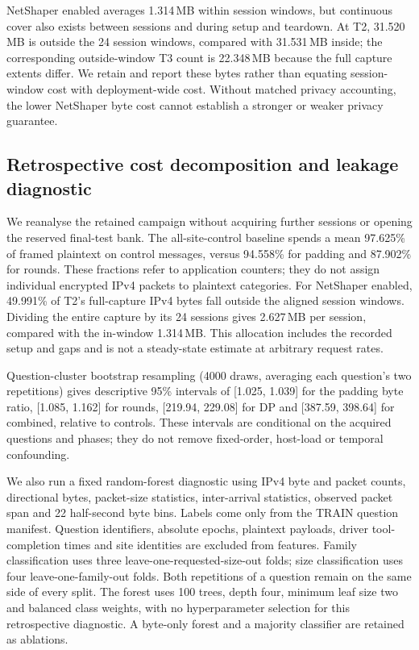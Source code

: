 NetShaper enabled averages 1.314\,MB within session windows, but continuous cover also exists between sessions and during setup and teardown. At T2, 31.520\,MB is outside the 24 session windows, compared with 31.531\,MB inside; the corresponding outside-window T3 count is 22.348\,MB because the full capture extents differ. We retain and report these bytes rather than equating session-window cost with deployment-wide cost. Without matched privacy accounting, the lower NetShaper byte cost cannot establish a stronger or weaker privacy guarantee.


\subsection{Retrospective cost decomposition and leakage diagnostic}\label{sec:retrospective}
We reanalyse the retained campaign without acquiring further sessions or opening the reserved final-test bank. The all-site-control baseline spends a mean 97.625\% of framed plaintext on control messages, versus 94.558\% for padding and 87.902\% for rounds. These fractions refer to application counters; they do not assign individual encrypted IPv4 packets to plaintext categories. For NetShaper enabled, 49.991\% of T2's full-capture IPv4 bytes fall outside the aligned session windows. Dividing the entire capture by its 24 sessions gives 2.627\,MB per session, compared with the in-window 1.314\,MB. This allocation includes the recorded setup and gaps and is not a steady-state estimate at arbitrary request rates.

Question-cluster bootstrap resampling (4000 draws, averaging each question's two repetitions) gives descriptive 95\% intervals of [1.025, 1.039] for the padding byte ratio, [1.085, 1.162] for rounds, [219.94, 229.08] for DP and [387.59, 398.64] for combined, relative to controls. These intervals are conditional on the acquired questions and phases; they do not remove fixed-order, host-load or temporal confounding.

We also run a fixed random-forest diagnostic using IPv4 byte and packet counts, directional bytes, packet-size statistics, inter-arrival statistics, observed packet span and 22 half-second byte bins. Labels come only from the TRAIN question manifest. Question identifiers, absolute epochs, plaintext payloads, driver tool-completion times and site identities are excluded from features. Family classification uses three leave-one-requested-size-out folds; size classification uses four leave-one-family-out folds. Both repetitions of a question remain on the same side of every split. The forest uses 100 trees, depth four, minimum leaf size two and balanced class weights, with no hyperparameter selection for this retrospective diagnostic. A byte-only forest and a majority classifier are retained as ablations.

